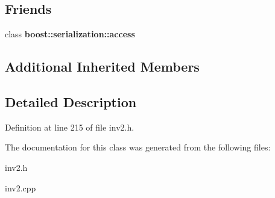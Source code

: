 \subsection*{Friends}
\begin{DoxyCompactItemize}
\item 
\hypertarget{class_belt_ac98d07dd8f7b70e16ccb9a01abf56b9c}{}\label{class_belt_ac98d07dd8f7b70e16ccb9a01abf56b9c} 
class {\bfseries boost\+::serialization\+::access}
\end{DoxyCompactItemize}
\subsection*{Additional Inherited Members}


\subsection{Detailed Description}


Definition at line 215 of file inv2.\+h.



The documentation for this class was generated from the following files\+:\begin{DoxyCompactItemize}
\item 
inv2.\+h\item 
inv2.\+cpp\end{DoxyCompactItemize}
